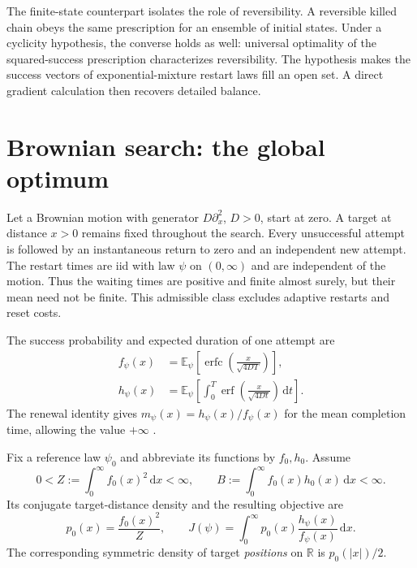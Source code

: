\documentclass[11pt]{amsart}
\theoremstyle{definition}
\theoremstyle{remark}
\newcommand{\E}{\mathbb E}
\newcommand{\R}{\mathbb R}
\newcommand{\erf}{\operatorname{erf}}
\newcommand{\erfc}{\operatorname{erfc}}
\newcommand{\dd}{\,\mathrm d}
\begin{document}
The finite-state counterpart isolates the role of reversibility. A reversible killed chain obeys the same prescription for an ensemble of initial states. Under a cyclicity hypothesis, the converse holds as well: universal optimality of the squared-success prescription characterizes reversibility. The hypothesis makes the success vectors of exponential-mixture restart laws fill an open set. A direct gradient calculation then recovers detailed balance.

\section{Brownian search: the global optimum}

Let a Brownian motion with generator $D\partial_x^2$, $D>0$, start at zero. A target at distance $x>0$ remains fixed throughout the search. Every unsuccessful attempt is followed by an instantaneous return to zero and an independent new attempt. The restart times are iid with law $\psi$ on $(0,\infty)$ and are independent of the motion. Thus the waiting times are positive and finite almost surely, but their mean need not be finite. This admissible class excludes adaptive restarts and reset costs.

The success probability and expected duration of one attempt are
\begin{align}
 f_\psi(x)&=\E_\psi\!\left[\erfc\!\left(\frac{x}{\sqrt{4DT}}\right)\right],\label{eq:success}\\
 h_\psi(x)&=\E_\psi\!\left[\int_0^T\erf\!\left(\frac{x}{\sqrt{4Dt}}\right)\dd t\right].\label{eq:duration}
\end{align}
The renewal identity gives $m_\psi(x)=h_\psi(x)/f_\psi(x)$ for the mean completion time, allowing the value $+\infty$ \cite{PalReuveni2017}.

Fix a reference law $\psi_0$ and abbreviate its functions by $f_0,h_0$. Assume
\begin{equation}\label{eq:finite}
 0<Z:=\int_0^\infty f_0(x)^2\dd x<\infty,
 \qquad B:=\int_0^\infty f_0(x)h_0(x)\dd x<\infty.
\end{equation}
Its conjugate target-distance density and the resulting objective are
\begin{equation}\label{eq:objective}
 p_0(x)=\frac{f_0(x)^2}{Z},\qquad
 J(\psi)=\int_0^\infty p_0(x)\frac{h_\psi(x)}{f_\psi(x)}\dd x.
\end{equation}
The corresponding symmetric density of target \emph{positions} on $\R$ is $p_0(|x|)/2$.
\end{document}
